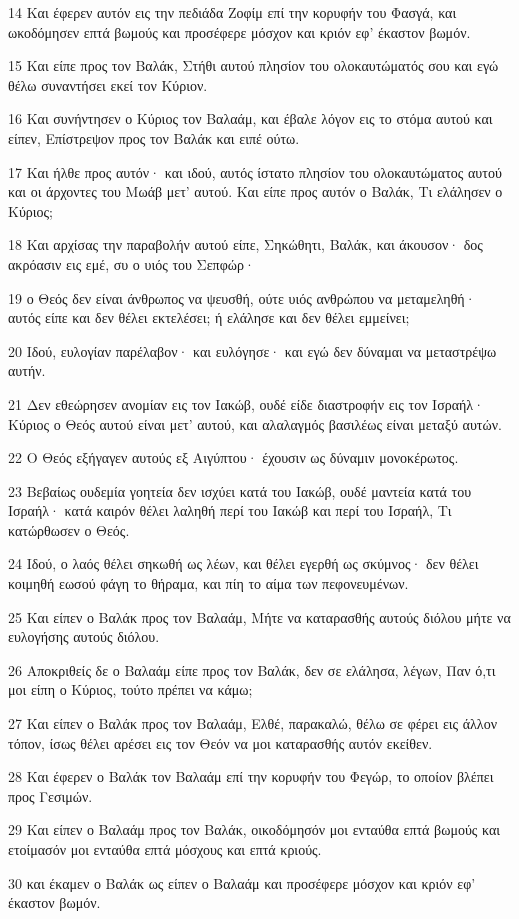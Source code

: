 \par 14 Και έφερεν αυτόν εις την πεδιάδα Ζοφίμ επί την κορυφήν του Φασγά, και ωκοδόμησεν επτά βωμούς και προσέφερε μόσχον και κριόν εφ' έκαστον βωμόν.
\par 15 Και είπε προς τον Βαλάκ, Στήθι αυτού πλησίον του ολοκαυτώματός σου και εγώ θέλω συναντήσει εκεί τον Κύριον.
\par 16 Και συνήντησεν ο Κύριος τον Βαλαάμ, και έβαλε λόγον εις το στόμα αυτού και είπεν, Επίστρεψον προς τον Βαλάκ και ειπέ ούτω.
\par 17 Και ήλθε προς αυτόν· και ιδού, αυτός ίστατο πλησίον του ολοκαυτώματος αυτού και οι άρχοντες του Μωάβ μετ' αυτού. Και είπε προς αυτόν ο Βαλάκ, Τι ελάλησεν ο Κύριος;
\par 18 Και αρχίσας την παραβολήν αυτού είπε, Σηκώθητι, Βαλάκ, και άκουσον· δος ακρόασιν εις εμέ, συ ο υιός του Σεπφώρ·
\par 19 ο Θεός δεν είναι άνθρωπος να ψευσθή, ούτε υιός ανθρώπου να μεταμεληθή· αυτός είπε και δεν θέλει εκτελέσει; ή ελάλησε και δεν θέλει εμμείνει;
\par 20 Ιδού, ευλογίαν παρέλαβον· και ευλόγησε· και εγώ δεν δύναμαι να μεταστρέψω αυτήν.
\par 21 Δεν εθεώρησεν ανομίαν εις τον Ιακώβ, ουδέ είδε διαστροφήν εις τον Ισραήλ· Κύριος ο Θεός αυτού είναι μετ' αυτού, και αλαλαγμός βασιλέως είναι μεταξύ αυτών.
\par 22 Ο Θεός εξήγαγεν αυτούς εξ Αιγύπτου· έχουσιν ως δύναμιν μονοκέρωτος.
\par 23 Βεβαίως ουδεμία γοητεία δεν ισχύει κατά του Ιακώβ, ουδέ μαντεία κατά του Ισραήλ· κατά καιρόν θέλει λαληθή περί του Ιακώβ και περί του Ισραήλ, Τι κατώρθωσεν ο Θεός.
\par 24 Ιδού, ο λαός θέλει σηκωθή ως λέων, και θέλει εγερθή ως σκύμνος· δεν θέλει κοιμηθή εωσού φάγη το θήραμα, και πίη το αίμα των πεφονευμένων.
\par 25 Και είπεν ο Βαλάκ προς τον Βαλαάμ, Μήτε να καταρασθής αυτούς διόλου μήτε να ευλογήσης αυτούς διόλου.
\par 26 Αποκριθείς δε ο Βαλαάμ είπε προς τον Βαλάκ, δεν σε ελάλησα, λέγων, Παν ό,τι μοι είπη ο Κύριος, τούτο πρέπει να κάμω;
\par 27 Και είπεν ο Βαλάκ προς τον Βαλαάμ, Ελθέ, παρακαλώ, θέλω σε φέρει εις άλλον τόπον, ίσως θέλει αρέσει εις τον Θεόν να μοι καταρασθής αυτόν εκείθεν.
\par 28 Και έφερεν ο Βαλάκ τον Βαλαάμ επί την κορυφήν του Φεγώρ, το οποίον βλέπει προς Γεσιμών.
\par 29 Και είπεν ο Βαλαάμ προς τον Βαλάκ, οικοδόμησόν μοι ενταύθα επτά βωμούς και ετοίμασόν μοι ενταύθα επτά μόσχους και επτά κριούς.
\par 30 και έκαμεν ο Βαλάκ ως είπεν ο Βαλαάμ και προσέφερε μόσχον και κριόν εφ' έκαστον βωμόν.

